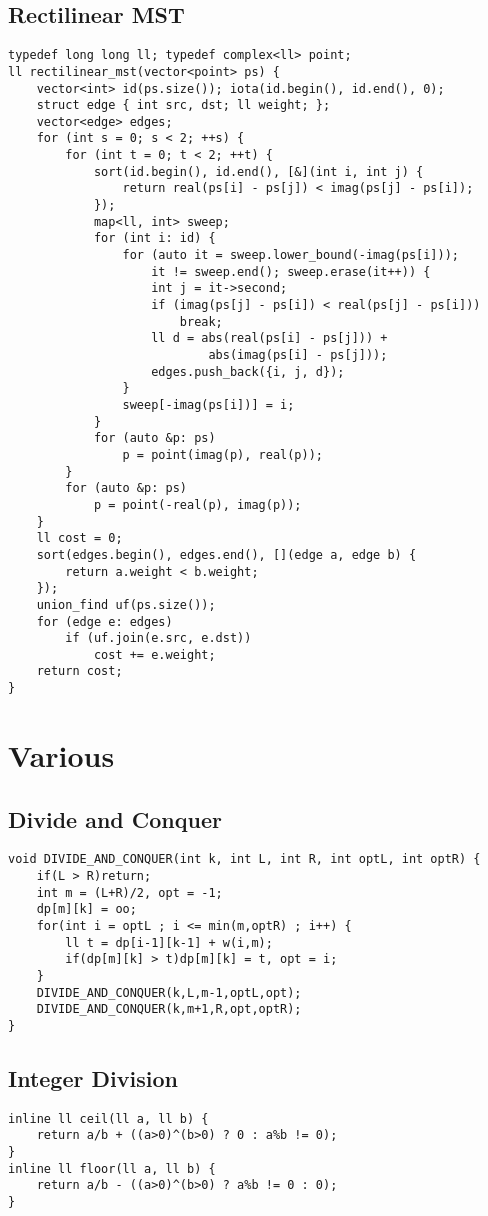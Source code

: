 \documentclass[landscape, 8pt, a4paper, oneside]{extarticle}
\begin{document}
\begin{multicols}{3}
\subsection{Rectilinear MST}
\begin{verbatim}
typedef long long ll; typedef complex<ll> point;
ll rectilinear_mst(vector<point> ps) {
    vector<int> id(ps.size()); iota(id.begin(), id.end(), 0);
    struct edge { int src, dst; ll weight; };
    vector<edge> edges;
    for (int s = 0; s < 2; ++s) {
        for (int t = 0; t < 2; ++t) {
            sort(id.begin(), id.end(), [&](int i, int j) {
                return real(ps[i] - ps[j]) < imag(ps[j] - ps[i]);
            });
            map<ll, int> sweep;
            for (int i: id) {
                for (auto it = sweep.lower_bound(-imag(ps[i]));
                    it != sweep.end(); sweep.erase(it++)) {
                    int j = it->second;
                    if (imag(ps[j] - ps[i]) < real(ps[j] - ps[i]))
                        break;
                    ll d = abs(real(ps[i] - ps[j])) +
                            abs(imag(ps[i] - ps[j]));
                    edges.push_back({i, j, d});
                }
                sweep[-imag(ps[i])] = i;
            }
            for (auto &p: ps)
                p = point(imag(p), real(p));
        }
        for (auto &p: ps)
            p = point(-real(p), imag(p));
    }
    ll cost = 0;
    sort(edges.begin(), edges.end(), [](edge a, edge b) {
        return a.weight < b.weight;
    });
    union_find uf(ps.size());
    for (edge e: edges)
        if (uf.join(e.src, e.dst))
            cost += e.weight;
    return cost;
}
\end{verbatim}
\section{Various}
\subsection{Divide and Conquer}
\begin{verbatim}
void DIVIDE_AND_CONQUER(int k, int L, int R, int optL, int optR) {
    if(L > R)return;
    int m = (L+R)/2, opt = -1;
    dp[m][k] = oo;
    for(int i = optL ; i <= min(m,optR) ; i++) {
        ll t = dp[i-1][k-1] + w(i,m);
        if(dp[m][k] > t)dp[m][k] = t, opt = i;
    }
    DIVIDE_AND_CONQUER(k,L,m-1,optL,opt);
    DIVIDE_AND_CONQUER(k,m+1,R,opt,optR);
}
\end{verbatim}
\subsection{Integer Division}
\begin{verbatim}
inline ll ceil(ll a, ll b) {
    return a/b + ((a>0)^(b>0) ? 0 : a%b != 0);
}
inline ll floor(ll a, ll b) {
    return a/b - ((a>0)^(b>0) ? a%b != 0 : 0);
}
\end{verbatim}

\end{multicols}
\end{document}
